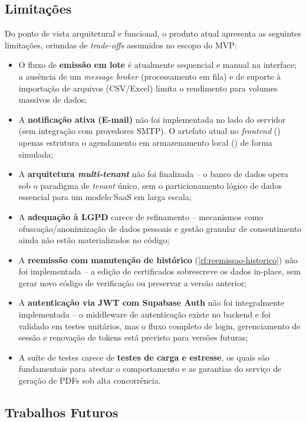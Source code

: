 \documentclass[12pt,openright,oneside,a4paper]{article}
\newcommand{\code}[1]{\texttt{\seqsplit{#1}}}
\newcounter{rf}
\begin{document}
\subsection{Limitações}

Do ponto de vista arquitetural e funcional, o produto atual apresenta as seguintes limitações, oriundas de \textit{trade-offs} assumidos no escopo do MVP:

\begin{itemize}
    \item O fluxo de \textbf{emissão em lote} é atualmente sequencial e manual na interface; a ausência de um \textit{message broker} (processamento em fila) e de suporte à importação de arquivos (CSV/Excel) limita o rendimento para volumes massivos de dados;
    \item A \textbf{notificação ativa (E-mail)} não foi implementada no lado do servidor (sem integração com provedores SMTP). O artefato atual no \textit{frontend} (\code{envios.ts}) apenas estrutura o agendamento em armazenamento local (\code{localStorage}) de forma simulada;
    \item A \textbf{arquitetura \textit{multi-tenant}} não foi finalizada -- o banco de dados opera sob o paradigma de \textit{tenant} único, sem o particionamento lógico de dados essencial para um modelo SaaS em larga escala;
    \item A \textbf{adequação à LGPD} carece de refinamento -- mecanismos como ofuscação/anonimização de dados pessoais e gestão granular de consentimento ainda não estão materializados no código;
    \item A \textbf{reemissão com manutenção de histórico} (\ref{rf:reemissao-historico}) não foi implementada -- a edição de certificados sobrescreve os dados in-place, sem gerar novo código de verificação ou preservar a versão anterior;
    \item A \textbf{autenticação via JWT com Supabase Auth} não foi integralmente implementada -- o middleware de autenticação existe no backend e foi validado em testes unitários, mas o fluxo completo de login, gerenciamento de sessão e renovação de tokens está previsto para versões futuras;
    \item A suíte de testes carece de \textbf{testes de carga e estresse}, os quais são fundamentais para atestar o comportamento e as garantias do serviço de geração de PDFs sob alta concorrência.
\end{itemize}

\subsection{Trabalhos Futuros}
\end{document}
